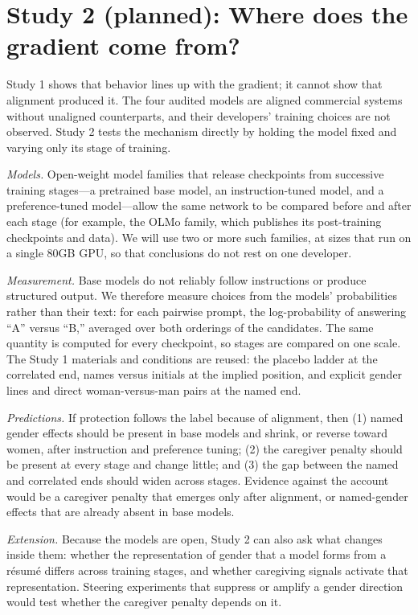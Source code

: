 \documentclass[11pt]{article}
\begin{document}
\hypertarget{study-2-planned-where-does-the-gradient-come-from}{%
\section{Study 2 (planned): Where does the gradient come
from?}\label{study-2-planned-where-does-the-gradient-come-from}}

Study 1 shows that behavior lines up with the gradient; it cannot show
that alignment produced it. The four audited models are aligned
commercial systems without unaligned counterparts, and their developers'
training choices are not observed. Study 2 tests the mechanism directly
by holding the model fixed and varying only its stage of training.

\emph{Models.} Open-weight model families that release checkpoints from
successive training stages---a pretrained base model, an
instruction-tuned model, and a preference-tuned model---allow the same
network to be compared before and after each stage (for example, the
OLMo family, which publishes its post-training checkpoints and data). We
will use two or more such families, at sizes that run on a single 80GB
GPU, so that conclusions do not rest on one developer.

\emph{Measurement.} Base models do not reliably follow instructions or
produce structured output. We therefore measure choices from the models'
probabilities rather than their text: for each pairwise prompt, the
log-probability of answering ``A'' versus ``B,'' averaged over both
orderings of the candidates. The same quantity is computed for every
checkpoint, so stages are compared on one scale. The Study 1 materials
and conditions are reused: the placebo ladder at the correlated end,
names versus initials at the implied position, and explicit gender lines
and direct woman-versus-man pairs at the named end.

\emph{Predictions.} If protection follows the label because of
alignment, then (1) named gender effects should be present in base
models and shrink, or reverse toward women, after instruction and
preference tuning; (2) the caregiver penalty should be present at every
stage and change little; and (3) the gap between the named and
correlated ends should widen across stages. Evidence against the account
would be a caregiver penalty that emerges only after alignment, or
named-gender effects that are already absent in base models.

\emph{Extension.} Because the models are open, Study 2 can also ask what
changes inside them: whether the representation of gender that a model
forms from a résumé differs across training stages, and whether
caregiving signals activate that representation. Steering experiments
that suppress or amplify a gender direction would test whether the
caregiver penalty depends on it.
\end{document}
